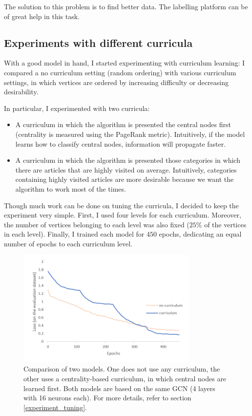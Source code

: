             The solution to this problem is to find better data. The labelling platform can be of great help in this task.
        \subsection{Experiments with different curricula}\label{experiments_curricula}
            With a good model in hand, I started experimenting with curriculum learning: I compared a no curriculum setting (random ordering) with various curriculum settings, in which vertices are ordered by increasing difficulty or decreasing desirability.
            
            In particular, I experimented with two curricula:
            \begin{itemize}
                \item A curriculum in which the algorithm is presented the central nodes first (centrality is measured using the PageRank metric). Intuitively, if the model learns how to classify central nodes, information will propagate faster.
                \item A curriculum in which the algorithm is presented those categories in which there are articles that are highly visited on average. Intuitively, categories containing highly visited articles are more desirable because we want the algorithm to work most of the times.
            \end{itemize}
            
            Though much work can be done on tuning the curricula, I decided to keep the experiment very simple. First, I used four levels for each curriculum. Moreover, the number of vertices belonging to each level was also fixed (\(25\%\) of the vertices in each level). Finally, I trained each model for \(450\) epochs, dedicating an equal number of epochs to each curriculum level.
            
            \begin{figure}
                \centering
                \includegraphics[width=0.8\textwidth]{images/cv_experiment.PNG}
                \caption{Comparison of two models. One does not use any curriculum, the other uses a centrality-based curriculum, in which central nodes are learned first. Both models are based on the same GCN (4 layers with 16 neurons each). For more details, refer to section \ref{experiment_tuning}.}
                \label{cv_experiment}
            \end{figure}
            
